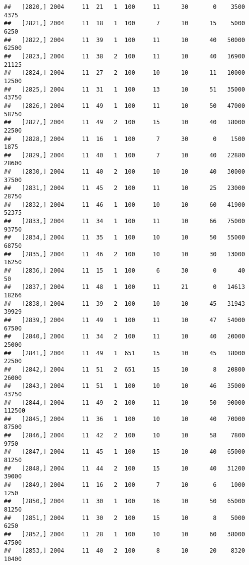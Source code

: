 \documentclass{article}\usepackage[]{graphicx}\usepackage[]{color}
\makeatletter
\newenvironment{kframe}{%
 \def\at@end@of@kframe{}%
 \ifinner\ifhmode%
  \def\at@end@of@kframe{\end{minipage}}%
  \begin{minipage}{\columnwidth}%
 \fi\fi%
 \def\FrameCommand##1{\hskip\@totalleftmargin \hskip-\fboxsep
 \colorbox{shadecolor}{##1}\hskip-\fboxsep
     \hskip-\linewidth \hskip-\@totalleftmargin \hskip\columnwidth}%
 \MakeFramed {\advance\hsize-\width
   \@totalleftmargin\z@ \linewidth\hsize
   \@setminipage}}%
 {\par\unskip\endMakeFramed%
 \at@end@of@kframe}
\newenvironment{knitrout}{}{} %
\makeatother
\begin{document}
\begin{knitrout}
\begin{kframe}
\begin{verbatim}
##   [2820,] 2004     11  21   1  100     11      30       0    3500    4375
##   [2821,] 2004     11  18   1  100      7      10      15    5000    6250
##   [2822,] 2004     11  39   1  100     11      10      40   50000   62500
##   [2823,] 2004     11  38   2  100     11      10      40   16900   21125
##   [2824,] 2004     11  27   2  100     10      10      11   10000   12500
##   [2825,] 2004     11  31   1  100     13      10      51   35000   43750
##   [2826,] 2004     11  49   1  100     11      10      50   47000   58750
##   [2827,] 2004     11  49   2  100     15      10      40   18000   22500
##   [2828,] 2004     11  16   1  100      7      30       0    1500    1875
##   [2829,] 2004     11  40   1  100      7      10      40   22880   28600
##   [2830,] 2004     11  40   2  100     10      10      40   30000   37500
##   [2831,] 2004     11  45   2  100     11      10      25   23000   28750
##   [2832,] 2004     11  46   1  100     10      10      60   41900   52375
##   [2833,] 2004     11  34   1  100     11      10      66   75000   93750
##   [2834,] 2004     11  35   1  100     10      10      50   55000   68750
##   [2835,] 2004     11  46   2  100     10      10      30   13000   16250
##   [2836,] 2004     11  15   1  100      6      30       0      40      50
##   [2837,] 2004     11  48   1  100     11      21       0   14613   18266
##   [2838,] 2004     11  39   2  100     10      10      45   31943   39929
##   [2839,] 2004     11  49   1  100     11      10      47   54000   67500
##   [2840,] 2004     11  34   2  100     11      10      40   20000   25000
##   [2841,] 2004     11  49   1  651     15      10      45   18000   22500
##   [2842,] 2004     11  51   2  651     15      10       8   20800   26000
##   [2843,] 2004     11  51   1  100     10      10      46   35000   43750
##   [2844,] 2004     11  49   2  100     11      10      50   90000  112500
##   [2845,] 2004     11  36   1  100     10      10      40   70000   87500
##   [2846,] 2004     11  42   2  100     10      10      58    7800    9750
##   [2847,] 2004     11  45   1  100     15      10      40   65000   81250
##   [2848,] 2004     11  44   2  100     15      10      40   31200   39000
##   [2849,] 2004     11  16   2  100      7      10       6    1000    1250
##   [2850,] 2004     11  30   1  100     16      10      50   65000   81250
##   [2851,] 2004     11  30   2  100     15      10       8    5000    6250
##   [2852,] 2004     11  28   1  100     10      10      60   38000   47500
##   [2853,] 2004     11  40   2  100      8      10      20    8320   10400

\end{verbatim}
\end{kframe}
\end{knitrout}
\end{document}
